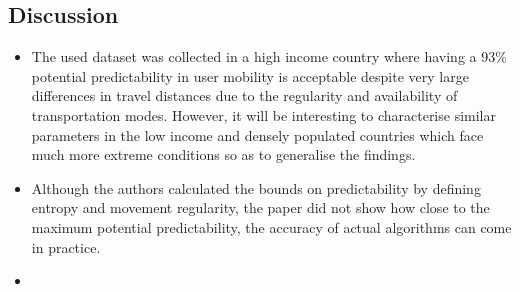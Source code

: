 \subsection{Discussion} \label{lect2-disc}

\begin{itemize}


\item The used dataset was collected in a high income country where having a 93\% potential predictability
in user mobility is acceptable despite very large differences in travel distances due to the regularity 
and availability of transportation modes. However, it will be interesting to characterise similar parameters 
in the low income and densely populated countries which face much more extreme conditions
so as to generalise the findings.  

\item Although the authors calculated the bounds on predictability by defining entropy and movement regularity, 
the paper did not show how close to the maximum potential predictability, the accuracy of actual algorithms can 
come in practice. 

\item 


\end{itemize}